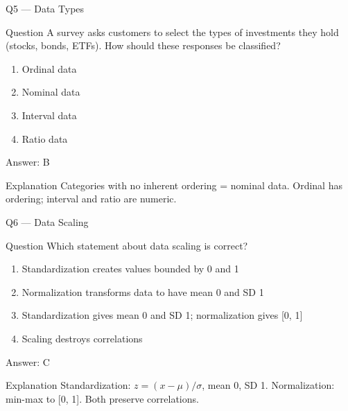 \documentclass[aspectratio=169,8pt]{beamer}
\begin{document}
	\begin{frame}{Q5 --- Data Types}
		\begin{block}{Question}
			A survey asks customers to select the types of investments they hold (stocks, bonds, ETFs). How should these responses be classified?
		\end{block}
		\begin{enumerate}
			\item Ordinal data
			\item Nominal data
			\item Interval data
			\item Ratio data
		\end{enumerate}
		\begin{exampleblock}{Answer: B}\end{exampleblock}
		\begin{block}{Explanation}
			Categories with no inherent ordering = nominal data. Ordinal has ordering; interval and ratio are numeric.
		\end{block}
	\end{frame}
	
	\begin{frame}{Q6 --- Data Scaling}
		\begin{block}{Question}
			Which statement about data scaling is correct?
		\end{block}
		\begin{enumerate}
			\item Standardization creates values bounded by 0 and 1
			\item Normalization transforms data to have mean 0 and SD 1
			\item Standardization gives mean 0 and SD 1; normalization gives [0, 1]
			\item Scaling destroys correlations
		\end{enumerate}
		\begin{exampleblock}{Answer: C}\end{exampleblock}
		\begin{block}{Explanation}
			Standardization: $z=(x-\mu)/\sigma$, mean 0, SD 1. Normalization: min-max to [0, 1]. Both preserve correlations.
		\end{block}
	\end{frame}
	
\end{document}
